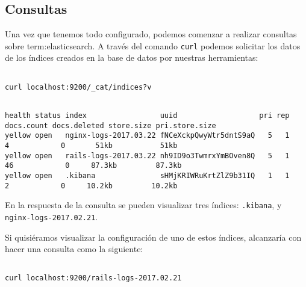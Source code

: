 \subsection{Consultas}
\label{consultas}

Una vez que tenemos todo configurado, podemos comenzar a realizar consultas
sobre \gls{term:elasticsearch}. A través del comando \texttt{curl} podemos
solicitar los datos de los índices creados en la base de datos por nuestras
herramientas:

\begin{lstlisting}

curl localhost:9200/_cat/indices?v

\end{lstlisting}

\begin{lstlisting}

health status index                 uuid                   pri rep docs.count docs.deleted store.size pri.store.size
yellow open   nginx-logs-2017.03.22 fNCeXckpQwyWtr5dntS9aQ   5   1          4            0       51kb           51kb
yellow open   rails-logs-2017.03.22 nh9ID9o3TwmrxYmBOven8Q   5   1         46            0     87.3kb         87.3kb
yellow open   .kibana               sHMjKRIWRuKrtZlZ9b31IQ   1   1          2            0     10.2kb         10.2kb

\end{lstlisting}

En la respuesta de la consulta se pueden visualizar tres índices:
\texttt{.kibana},  y
\texttt{nginx-logs-2017.02.21}.

Si quisiéramos visualizar la configuración de uno de estos índices, alcanzaría
con hacer una consulta como la siguiente:

\begin{lstlisting}

curl localhost:9200/rails-logs-2017.02.21

\end{lstlisting}


